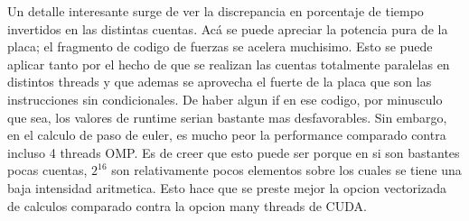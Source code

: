Un detalle interesante surge de ver la discrepancia en porcentaje de tiempo invertidos en las distintas cuentas. Ac\'a se puede apreciar
la potencia pura de la placa; el fragmento de codigo de fuerzas se acelera muchisimo. Esto se puede aplicar tanto por el hecho de
que se realizan las cuentas totalmente paralelas en distintos threads y que ademas se aprovecha el fuerte de la placa que son
las instrucciones sin condicionales. De haber algun if en ese codigo, por minusculo que sea, los valores de runtime serian bastante
mas desfavorables. Sin embargo, en el calculo de paso de euler, es mucho peor la performance comparado contra incluso 4 threads OMP.
Es de creer que esto puede ser porque en si son bastantes pocas cuentas, $2^16$ son relativamente pocos elementos sobre los cuales
se tiene una baja intensidad aritmetica. Esto hace que se preste mejor la opcion vectorizada de calculos comparado contra la opcion 
many threads de CUDA. 
